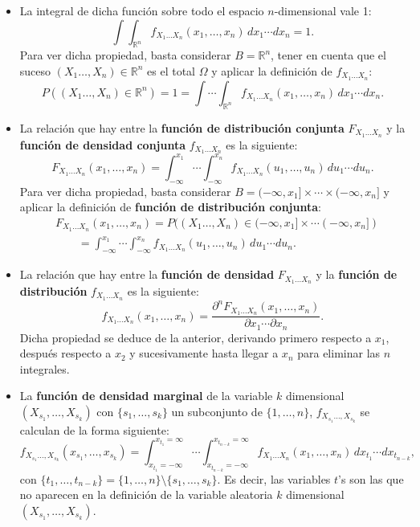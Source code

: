 \documentclass[]{book}
\begin{document}
\begin{itemize}
\item
  La integral de dicha función sobre todo el espacio \(n\)-dimensional vale 1:
  \[
  \int\int_{\mathbb{R}^n} f_{X_1\ldots X_n}(x_1,\ldots,x_n)\,dx_1\cdots dx_n =1.
  \]
  Para ver dicha propiedad, basta considerar \(B=\mathbb{R}^n\), tener en cuenta que el suceso \((X_1\ldots,X_n)\in \mathbb{R}^n\) es el total \(\Omega\) y aplicar la definición de \(f_{X_1\ldots X_n}\):
  \[
  P((X_1\ldots,X_n)\in \mathbb{R}^n)=1= \int\cdots\int_{\mathbb{R}^n} f_{X_1\ldots X_n}(x_1,\ldots,x_n)\,dx_1\cdots dx_n.
  \]
\item
  La relación que hay entre la \textbf{función de distribución conjunta} \(F_{X_1\ldots X_n}\) y la \textbf{función de densidad conjunta} \(f_{X_1\ldots X_n}\) es la siguiente:
  \[
  F_{X_1\ldots X_n}(x_1,\ldots,x_n)=\int_{-\infty}^{x_1}\cdots\int_{-\infty}^{x_n} f_{X_1\ldots X_n}(u_1,\ldots,u_n)\,du_1\cdots du_n.
  \]
  Para ver dicha propiedad, basta considerar \(B=(-\infty,x_1]\times\cdots\times (-\infty,x_n]\) y aplicar la definición de \textbf{función de distribución conjunta}:
  \[
  \begin{array}{rl}
  & F_{X_1\ldots X_n}(x_1,\ldots,x_n)=P((X_1\ldots,X_n)\in (-\infty,x_1]\times\cdots (-\infty,x_n])\\ &\qquad =\int_{-\infty}^{x_1}\cdots\int_{-\infty}^{x_n} f_{X_1\ldots X_n}(u_1,\ldots,u_n)\,du_1\cdots du_n.
  \end{array}
  \]
\item
  La relación que hay entre la \textbf{función de densidad} \(F_{X_1\ldots X_n}\) y la \textbf{función de distribución} \(f_{X_1\ldots X_n}\) es la siguiente:
  \[
  f_{X_1\ldots X_n}(x_1,\ldots,x_n)=\frac{\partial^n F_{X_1\ldots X_n}(x_1,\ldots,x_n)}{\partial x_1\cdots\partial x_n}.
  \]
  Dicha propiedad se deduce de la anterior, derivando primero respecto a \(x_1\), después respecto a \(x_2\) y sucesivamente hasta llegar a \(x_n\) para eliminar las \(n\) integrales.
\item
  La \textbf{función de densidad marginal} de la variable \(k\) dimensional \((X_{s_1},\ldots,X_{s_k})\) con \(\{s_1,\ldots, s_k\}\) un subconjunto de \(\{1,\ldots,n\}\), \(f_{X_{s_1}\ldots,X_{s_k}}\) se calculan de la forma siguiente:
  \[
  f_{X_{s_1}\ldots,X_{s_k}}(x_{s_1},\ldots,x_{s_k})=\int_{x_{t_1}=-\infty}^{x_{t_1}=\infty}\cdots \int_{x_{t_{n-k}}=-\infty}^{x_{t_{n-k}}=\infty} f_{X_1\ldots X_n}(x_1,\ldots,x_n)\, dx_{t_1}\cdots dx_{t_{n-k}},
  \]
  con \(\{t_1,\ldots,t_{n-k}\}=\{1,\ldots,n\}\setminus \{s_1,\ldots,s_k\}.\) Es decir, las variables \(t\)'s son las que no aparecen en la definición de la variable aleatoria \(k\) dimensional \((X_{s_1},\ldots,X_{s_k})\).
\end{itemize}
\end{document}
